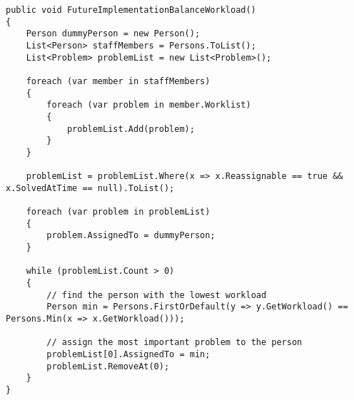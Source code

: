\begin{lstlisting}[style=sourceCode, caption=\myCaption{A possible future implementation of the \me{BalanceWorkload} algorithm}, label=lst:futureimplementationbalanceworkload]
public void FutureImplementationBalanceWorkload()
{
    Person dummyPerson = new Person();
    List<Person> staffMembers = Persons.ToList();
    List<Problem> problemList = new List<Problem>();

    foreach (var member in staffMembers)
    {
        foreach (var problem in member.Worklist)
        {
            problemList.Add(problem);
        }
    }

    problemList = problemList.Where(x => x.Reassignable == true && x.SolvedAtTime == null).ToList();

    foreach (var problem in problemList)
    {
        problem.AssignedTo = dummyPerson;
    }

    while (problemList.Count > 0)
    {
        // find the person with the lowest workload
        Person min = Persons.FirstOrDefault(y => y.GetWorkload() == Persons.Min(x => x.GetWorkload()));

        // assign the most important problem to the person
        problemList[0].AssignedTo = min;
        problemList.RemoveAt(0);
    }
}
\end{lstlisting}


